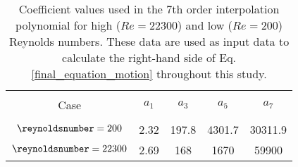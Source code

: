 \begin{table}[ht]

\begin{center}
\setlength{\unitlength}{\textwidth}

\begin{tabular}{c c c c c} %
\hline\hline %
\\[0.2ex]
Case & $a_1$ & $a_3$ & $a_5$ & $a_7$ \\ [0.8ex] %
\hline 
\\[0.8ex]%
$\reynoldsnumber = 200$ & 2.32 & 197.8 & 4301.7 & 30311.9 \\[0.8ex]%
$\reynoldsnumber = 22300$ & 2.69 & 168 & 1670 & 59900 \\ [1ex] %
\hline %
\end{tabular}

\caption{Coefficient values used in the 7th order interpolation polynomial for high ($Re=22300$) and low ($Re=200$) Reynolds numbers. These data are used as input data to calculate the right-hand side of Eq. \ref{final_equation_motion} throughout this study.}
 
\label{table:cy-coefficients} %
\end{center}
\end{table}

